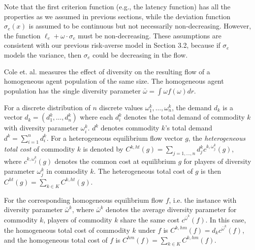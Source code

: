 Note that the first criterion function (e.g., the latency function) has all the properties as we assumed in previous sections, while the deviation function $\sigma_e(x)$ is assumed to be continuous but not necessarily non-decreasing. However, the function $\ell_e+\omega\cdot \sigma_e$ must be non-decreasing. These assumptions are consistent with our previous risk-averse model in Section 3.2, because if $\sigma_e$ models the variance, then $\sigma_e$ could be decreasing in the flow.

Cole et. al. measures the effect of diversity on the resulting flow of a homogeneous agent population of the same size. The homogeneous agent population has the single diversity parameter $\bar{\omega}=\int \omega f(\omega)d r$. 

For a discrete distribution of $n$ discrete values $\omega_1^k, \dots, \omega_n^k$, the demand $d_k$ is a vector $d_k=(d_1^k, \dots, d_n^k)$ where each $d_i^k$ denotes the total demand of commodity $k$ with diversity parameter $\omega_i^k$. $d^k$ denotes commodity $k$'s total demand $d^k=\sum_{i=1}^n d_i^k$. For a heterogeneous equilibrium flow vector $g$, the {\it heterogeneous total cost} of commodity $k$ is denoted by $C^{k,ht}(g)=\sum_{j=1,\dots, n} d_j^k c^{k, \omega_j^k}(g)$, where $c^{k, \omega_j^k}(g)$ denotes the common cost at equilibrium $g$ for players of diversity parameter $\omega_j^k$ in commodity $k$. The heterogeneous total cost of $g$ is then $C^{ht}(g)=\sum_{k\in K} C^{k,ht}(g)$. 


For the corresponding homogeneous equilibrium flow $f$, i.e. the instance with diversity parameter $\bar{\omega}^k$, where $\bar{\omega}^k$ denotes the average diversity parameter for commodity $k$, players of commodity $k$ share the same cost $c^{\bar{\omega}^k}(f)$. In this case, the homogeneous total cost of commodity $k$ under $f$ is $C^{k,hm}(f)=d_kc^{\bar{\omega}^k}(f)$, and the homogeneous total cost of $f$ is $C^{hm}(f)=\sum_{k\in K} C^{k,hm}(f)$. 

